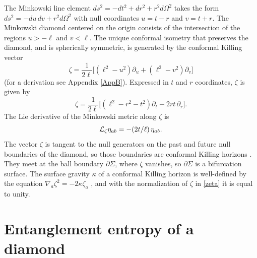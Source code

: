 \documentclass[aps,prd,twocolumn,showpacs,groupedaddress,nofootinbib,longbibliography]{revtex4-1}
\def\beq{\begin{equation}}
\def\eeq{\end{equation}}
\def\z{\zeta}
\def\k{\kappa}
\def\O{\Omega}
\def\L{{\cal L}}
\begin{document}
The Minkowski line element $ds^2 = -dt^2 + dr^2 + r^2d\O^2$ takes the 
form $ds^2 = - du\, dv + r^2d\O^2$ with null coordinates $u=t-r$ and $v=t+r$. 
The Minkowski diamond centered on the origin consists of the intersection of the regions $u>-\ell$ and $v<\ell$. 
The unique conformal isometry that preserves the diamond, and is spherically symmetric, is 
generated by the conformal Killing vector 
%
\beq\label{zeta}
\zeta = \frac{1}{2\ell}\bigl[(\ell^2-u^2)\partial_u +(\ell^2-v^2)\partial_v\bigr]
\eeq
% 
(for a derivation see Appendix \ref{AppB}).
Expressed in $t$ and $r$ coordinates, $\zeta$ is given by
%
\beq
\zeta = \frac{1}{2\ell}\bigl[(\ell^2-r^2-t^2)\partial_t -2rt\, \partial_r\bigr].
\eeq
%
The Lie derivative of the Minkowski metric along $\z$ is 
%
\beq\label{Lieg}
\L_\z \eta_{ab} = -(2t/\ell)\, \eta_{ab}.
\eeq
%
The vector $\z$ is tangent to the null generators on the past and future null boundaries of the diamond, 
so those boundaries are  conformal Killing horizons \cite{1979JMP....20..409D}. 
They meet at the ball boundary $\partial\Sigma$, where $\z$ vanishes,
so $\partial\Sigma$ is a bifurcation 
surface.  The surface gravity $\k$ of a conformal 
Killing horizon is well-defined by the equation $\nabla_a \z^2 = -2\k \z_a$ \cite{Jacobson:1993pf}, 
and with the normalization of $\z$ in \eqref{zeta} it is equal to unity. 

\section{Entanglement entropy of a diamond}
\end{document}
